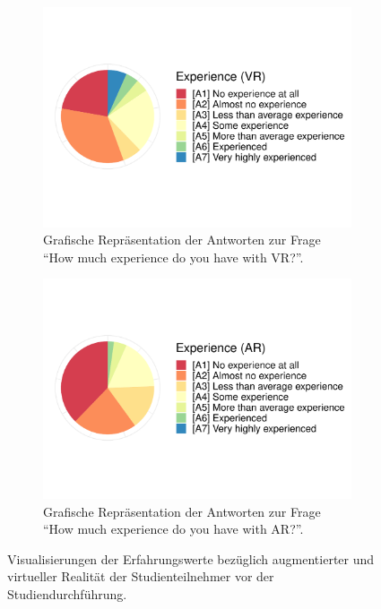 \begin{figure}[H]
	\centering
	\begin{subfigure}{0.48\textwidth}
		\includegraphics[width=\textwidth]{./_StudyResults/expVr}
		\caption{Grafische Repräsentation der Antworten zur Frage "`How much experience do you have with VR?"'.}
		\label{fig:expVr}
	\end{subfigure}%
	\hfill
	\begin{subfigure}{0.48\textwidth}
		\includegraphics[width=\textwidth]{./_StudyResults/expAr}
		\caption{Grafische Repräsentation der Antworten zur Frage "`How much experience do you have with AR?"'.}
		\label{fig:expAr}
	\end{subfigure}
	\caption{Visualisierungen der Erfahrungswerte bezüglich augmentierter und virtueller Realität der Studienteilnehmer vor der Studiendurchführung.} %
\end{figure}

